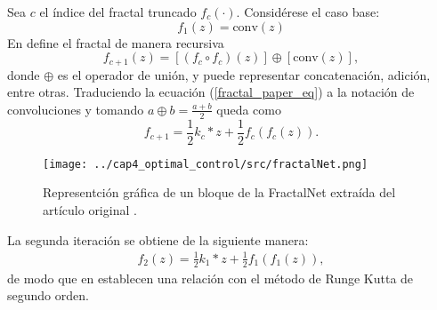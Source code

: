 Sea $c$ el índice del fractal truncado $f_c(\cdot)$. Considérese el caso base:
\begin{equation}
   f_1(z) = \text{conv}(z)
\end{equation}
En \cite{fractalNet} define el fractal de manera recursiva
\begin{equation}
   \label{fractal_paper_eq}
   f_{c+1}(z) = [(f_c  \circ f_c)(z)] \oplus [\text{conv}(z)],
\end{equation}
donde $\oplus$ es el operador de unión, y puede representar concatenación, adición, entre otras. Traduciendo la ecuación (\ref{fractal_paper_eq}) a la notación de convoluciones y tomando $a\oplus b = \frac{a+b}{2}$ queda como 
\begin{equation}
   \label{fractalnet_eq}
   f_{c+1} =\frac{1}{2}k_c * z + \frac{1}{2}f_c(f_c(z)).
\end{equation}
\begin{figure}[H]
   \centering
   \texttt{[image: ../cap4\_optimal\_control/src/fractalNet.png]}
   \caption{Representción gráfica de un bloque de la FractalNet extraída del artículo original \cite{fractalNet}.}
\end{figure}
La segunda iteración se obtiene de la siguiente manera:
\begin{align}
   f_2(z) = \frac{1}{2}k_1*z + \frac{1}{2}f_1(f_1(z)),
\end{align}
de modo que en \cite{numerical_ode_and_architectures} establecen una relación con el método de Runge Kutta de segundo orden.
